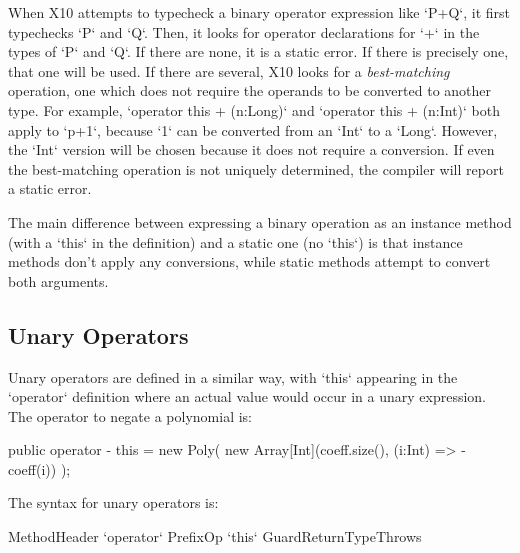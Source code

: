 When X10 attempts to typecheck a binary operator expression like \xcd`P+Q`, it
first typechecks \xcd`P` and \xcd`Q`. Then, it looks for operator declarations
for \xcd`+` in the types of \xcd`P` and \xcd`Q`. If there are none, it is a
static error. If there is precisely one, that one will be used. If there are
several, X10 looks for a {\em best-matching} operation, \viz{} one which does
not require the operands to be converted to another type. For example,
\xcd`operator this + (n:Long)` and \xcd`operator this + (n:Int)` both apply to
\xcd`p+1`, because \xcd`1` can be converted from an \xcd`Int` to a \xcd`Long`.
However, the \xcd`Int` version will be chosen because it does not require a
conversion. If even the best-matching operation is not uniquely determined,
the compiler will report a static error.

The main difference between expressing a binary operation as an instance
method (with a \xcd`this` in the definition) and a static one (no \xcd`this`)
is that instance methods don't apply any conversions, while static methods
attempt to convert both arguments. 


\subsection{Unary Operators}

Unary operators are defined in a similar way, with \xcd`this` appearing in the
\xcd`operator` definition where an actual value would occur in a unary
expression.  The operator to negate a polynomial is: 

\begin{xten}
  public operator - this = new Poly(
    new Array[Int](coeff.size(), (i:Int) => -coeff(i))
    );
\end{xten}

The syntax for unary operators is:

\begin{grammar}
MethodHeader \:
  \xcd`operator` PrefixOp \xcd`this`    Guard\opt ReturnType\opt  Throws\opt 
\end{grammar}

